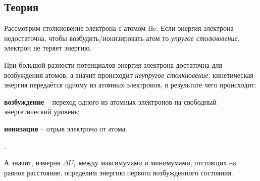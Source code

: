 \subsection*{Теория}


Рассмотрим столкновение электрона с атомом He. Если энергия электрона недостаточна, чтобы возбудить/ионизировать атом то \textit{упругое столкновение}, электрон не теряет энергию.

При большой разности потенциалов энергия электрона достаточна для возбуждения атомов, а значит происходит \textit{неупругое столкновение}, кинетическая энергия передаётся одному из атомных электронов, в результате чего происходит: \vspace{-2mm}
\begin{itemize*}
    \item \textbf{возбуждение} -- переход одного из атомных электронов на свободный энергетический уровень;
    \item \textbf{ионизация} -- отрыв электрона от атома.
\end{itemize*}.



А значит, измерив $\Delta U_1$ между максимумами и минимумами, отстоящих на равное расстояние, определим  энергию первого возбужденного состояния. 
